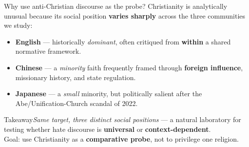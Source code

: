 \documentclass[aspectratio=169,10pt]{beamer}
\newcommand{\emphc}[1]{\textcolor{uzhaccent}{\textbf{#1}}}
\newcommand{\keyword}[1]{\textcolor{uzhblue}{\textbf{#1}}}
\newcommand{\takeaway}[1]{%
  \vspace{0.3em}
  \begin{block}{Takeaway}#1\end{block}}
\begin{document}
\begin{frame}{Why use anti-Christian discourse as the probe?}
  Christianity is analytically unusual because its social position
  \keyword{varies sharply} across the three communities we study:
  \vspace{0.4em}
  \begin{itemize}
    \item \keyword{English} — historically \emph{dominant}, often critiqued
      from \textbf{within} a shared normative framework.
    \item \keyword{Chinese} — a \emph{minority} faith frequently framed
      through \textbf{foreign influence}, missionary history, and state
      regulation.
    \item \keyword{Japanese} — a \emph{small} minority, but politically
      salient after the Abe/Unification-Church scandal of 2022.
  \end{itemize}
  \vspace{0.5em}
  \takeaway{\textit{Same target, three distinct social positions} —
  a natural laboratory for testing whether hate discourse is
  \emphc{universal} or \emphc{context-dependent}.\\[0.3em]
  \textcolor{mutedgray}{\footnotesize
    Goal: use Christianity as a \keyword{comparative probe},
    not to privilege one religion.}}
\end{frame}
\end{document}
